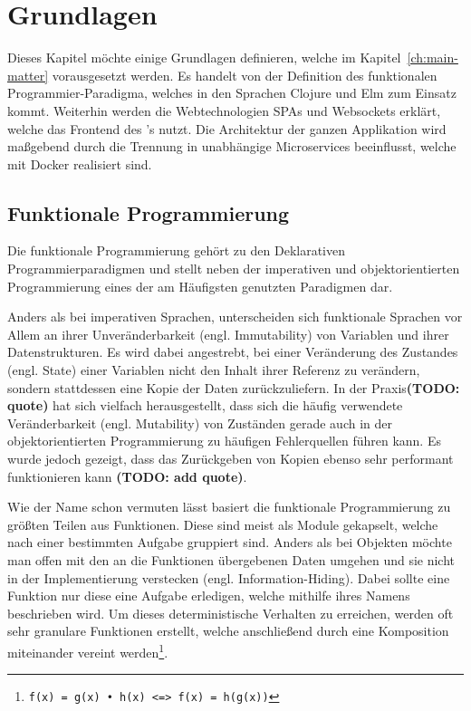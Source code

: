 \chapter{Grundlagen}
\label{ch:fundamentals}

Dieses Kapitel möchte einige Grundlagen definieren, welche im Kapitel~\ref{ch:main-matter} vorausgesetzt werden.
Es handelt von der Definition des funktionalen Programmier-Paradigma, welches in den Sprachen Clojure und Elm zum Einsatz kommt.
Weiterhin werden die Webtechnologien \acp{SPA} und Websockets erklärt, welche das Frontend des 's nutzt. 
Die Architektur der ganzen Applikation wird maßgebend durch die Trennung in unabhängige Microservices beeinflusst, welche mit Docker realisiert sind.
\section{Funktionale Programmierung}
Die funktionale Programmierung gehört zu den Deklarativen Programmierparadigmen und stellt neben der imperativen und objektorientierten Programmierung eines der am Häufigsten genutzten Paradigmen dar.
\par
Anders als bei imperativen Sprachen, unterscheiden sich funktionale Sprachen vor Allem an ihrer Unveränderbarkeit (engl. Immutability) von Variablen und ihrer Datenstrukturen.
Es wird dabei angestrebt, bei einer Veränderung des Zustandes (engl. State) einer Variablen nicht den Inhalt ihrer Referenz zu verändern, sondern stattdessen eine Kopie der Daten zurückzuliefern.
In der Praxis{\bfseries (TODO: quote)} hat sich vielfach herausgestellt, dass sich die häufig verwendete Veränderbarkeit (engl. Mutability) von Zuständen gerade auch in der objektorientierten Programmierung zu häufigen Fehlerquellen führen kann.
Es wurde jedoch gezeigt, dass das Zurückgeben von Kopien ebenso sehr performant funktionieren kann {\bfseries (TODO: add quote)}.
\par
Wie der Name schon vermuten lässt basiert die funktionale Programmierung zu größten Teilen aus Funktionen. 
Diese sind meist als Module gekapselt, welche nach einer bestimmten Aufgabe gruppiert sind. 
Anders als bei Objekten möchte man offen mit den an die Funktionen übergebenen Daten umgehen und sie nicht in der Implementierung verstecken (engl. Information-Hiding). 
Dabei sollte eine Funktion nur diese eine Aufgabe erledigen, welche mithilfe ihres Namens beschrieben wird. 
Um dieses deterministische Verhalten zu erreichen, werden oft sehr granulare Funktionen erstellt, welche anschließend durch eine Komposition miteinander vereint werden\footnote{\texttt{f(x) = g(x) • h(x) <=> f(x) = h(g(x))}}.
